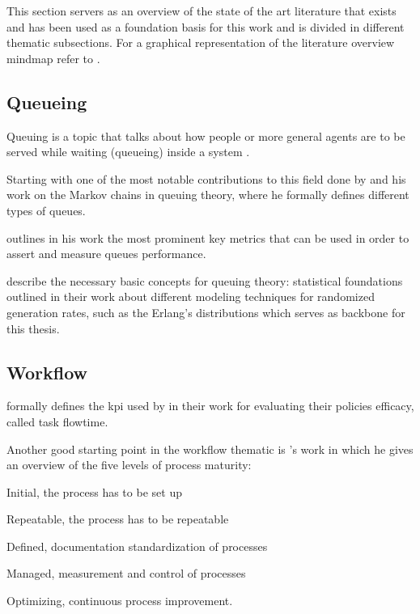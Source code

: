 \documentclass[draft=false]{seal_thesis}
\begin{document}
This section servers as an overview of the state of the art literature that exists and has been used as a foundation basis for this work and is divided in different thematic subsections. For a graphical representation of the literature overview mindmap refer to .

\subsection{Queueing}

Queuing is a topic that talks about how people or more general agents are to be served while waiting (\ie queueing) inside a system \citep{Kendall1953}.

Starting with one of the most notable contributions to this field done by \citet{Kendall1953} and his work on the Markov chains in queuing theory, where he formally defines different types of queues.

\citet{Pinedo2008} outlines in his work the most prominent key metrics that can be used in order to assert and measure queues performance.

\citet{Adan2016} describe the necessary basic concepts for queuing theory: statistical foundations outlined in their work about different modeling techniques for randomized generation rates, such as the Erlang's distributions which serves as backbone for this thesis.

\subsection{Workflow}
\label{subsec:workflow}

\citet{Baker1974} formally defines the \gls{kpi} used by \citet{Zeng2005} in their work for evaluating their policies efficacy, called task flowtime.

Another good starting point in the workflow thematic is \citet{Macintosh1993}'s work in which he gives an overview of the five levels of process maturity:
\begin{enumerate*}
	\item Initial, the process has to be set up
	\item Repeatable, the process has to be repeatable
	\item Defined, documentation standardization of processes
	\item Managed, measurement and control of processes
	\item Optimizing, continuous process improvement.
\end{enumerate*}
\end{document}
